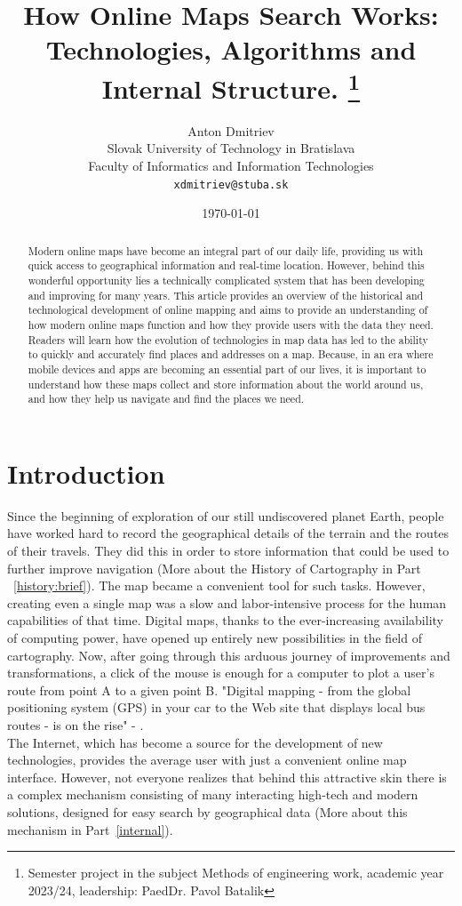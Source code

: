 \documentclass[10pt,oneside,english,a4paper]{article}
\title{How Online Maps Search Works: Technologies, Algorithms and Internal Structure.
\thanks{Semester project in the subject Methods of engineering work, academic year 2023/24, leadership: PaedDr. Pavol Batalik}}
\author{Anton Dmitriev\\[2pt]
	{\small Slovak University of Technology in Bratislava}\\
	{\small Faculty of Informatics and Information Technologies}\\
	{\small \texttt{xdmitriev@stuba.sk}}
	}
\date{\small \today}
\begin{document}
\maketitle

\begin{abstract}
	Modern online maps have become an integral part of our daily life, providing us with quick access to geographical information and real-time location. However, behind this wonderful opportunity lies a technically complicated system that has been developing and improving for many years. This article provides an overview of the historical and technological development of online mapping and aims to provide an understanding of how modern online maps function and how they provide users with the data they need. Readers will learn how the evolution of technologies in map data has led to the ability to quickly and accurately find places and addresses on a map. Because, in an era where mobile devices and apps are becoming an essential part of our lives, it is important to understand how these maps collect and store information about the world around us, and how they help us navigate and find the places we need.
\end{abstract}

\section{Introduction}
Since the beginning of exploration of our still undiscovered planet Earth, people have worked hard to record the geographical details of the terrain and the routes of their travels. They did this in order to store information that could be used to further improve navigation (More about the History of Cartography in Part ~\ref{history:brief}). The map became a convenient tool for such tasks. However, creating even a single map was a slow and labor-intensive process for the human capabilities of that time. Digital maps, thanks to the ever-increasing availability of computing power, have opened up entirely new possibilities in the field of cartography. Now, after going through this arduous journey of improvements and transformations, a click of the mouse is enough for a computer to plot a user's route from point A to a given point B. "Digital mapping - from the global positioning system (GPS) in your car to the Web site that displays local bus routes - is on the rise" - \cite{Mitchell2005}.
\\The Internet, which has become a source for the development of new technologies, provides the average user with just a convenient online map interface. However, not everyone realizes that behind this attractive skin there is a complex mechanism consisting of many interacting high-tech and modern solutions, designed for easy search by geographical data (More about this mechanism in Part~\ref{internal}).
\end{document}
